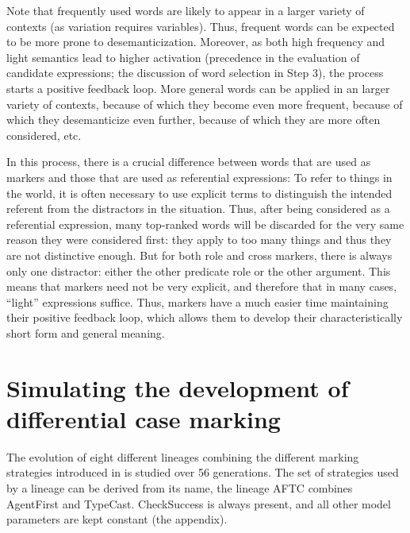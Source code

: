 \documentclass[output=paper]{LSP/langsci}
\begin{document}
\newpage 
Note that frequently used words are likely to appear in a larger variety of contexts (as variation requires variables). Thus, frequent words can be expected to be more prone to desemanticization. Moreover, as both high frequency and light semantics lead to higher activation (\ie precedence in the evaluation of candidate expressions; \cf the discussion of word selection in Step 3), the  process starts a positive feedback loop. More general words can be applied in an larger variety of contexts, because of which they become even more frequent, because of which they desemanticize even further, because of which they are more often considered, etc.

In this process, there is a crucial difference between words that are used as markers and those that are used as referential expressions: To refer to things in the world, it is often necessary to use explicit terms to distinguish the intended referent from the distractors in the situation. Thus, after being considered as a referential expression, many top-ranked words will be discarded for the very same reason they were considered first: they apply to too many things and thus they are not distinctive enough. But for both role and cross markers, there is always only one distractor: either the other predicate role or the other argument. This means that markers need not be very explicit, and therefore that in many cases, ``light'' expressions suffice. Thus, markers have a much easier time maintaining their positive feedback loop, which allows them to develop their characteristically short form and general meaning.

\section{Simulating the development of differential case marking}\label{17-le-sec:Results}
The evolution of eight different lineages combining the different marking strategies introduced in  is studied over 56 generations. The set of strategies used by a lineage can be derived from its name, \eg the lineage AFTC combines AgentFirst and TypeCast. CheckSuccess is always present, and all other model parameters are kept constant (\cf the appendix). 
\end{document}
